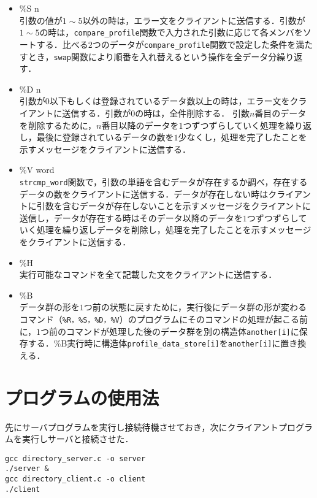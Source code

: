 \documentclass{jarticle}[11pt]
\begin{document}
\begin{itemize}
\item \%S n\\
引数の値が$1\sim5$以外の時は，エラー文をクライアントに送信する．引数が$1\sim5$の時は，\verb|compare_profile|関数で入力された引数に応じて各メンバをソートする．比べる$2$つのデータが\verb|compare_profile|関数で設定した条件を満たすとき，\verb|swap|関数により順番を入れ替えるという操作を全データ分繰り返す．

\item \%D n\\
引数が$0$以下もしくは登録されているデータ数以上の時は，エラー文をクライアントに送信する．引数が$0$の時は，全件削除する．
引数$n$番目のデータを削除するために，$n$番目以降のデータを$1$つずつずらしていく処理を繰り返し，最後に登録されているデータの数を$1$少なくし，処理を完了したことを示すメッセージをクライアントに送信する．

\item \%V word\\
\verb|strcmp_word|関数で，引数の単語を含むデータが存在するか調べ，存在するデータの数をクライアントに送信する．データが存在しない時はクライアントに引数を含むデータが存在しないことを示すメッセージをクライアントに送信し，データが存在する時はそのデータ以降のデータを$1$つずつずらしていく処理を繰り返しデータを削除し，処理を完了したことを示すメッセージをクライアントに送信する．

\item \%H \\
実行可能なコマンドを全て記載した文をクライアントに送信する．

\item \%B \\
データ群の形を$1$つ前の状態に戻すために，実行後にデータ群の形が変わるコマンド（\verb|%R，%S，%D，%V|）のプログラムにそのコマンドの処理が起こる前に，$1$つ前のコマンドが処理した後のデータ群を別の構造体\verb|another[i]|に保存する．\%B実行時に構造体\verb|profile_data_store[i]|を\verb|another[i]|に置き換える．
\end{itemize}


    \section{プログラムの使用法}
先にサーバプログラムを実行し接続待機させておき，次にクライアントプログラムを実行しサーバと接続させた．

\begin{verbatim}
gcc directory_server.c -o server
./server &
gcc directory_client.c -o client
./client
\end{verbatim}
\end{document}
